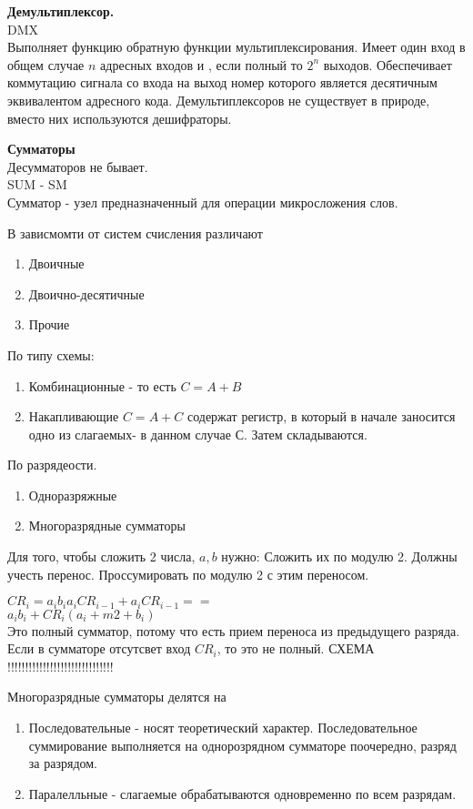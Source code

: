 \Large{ \textbf {Демультиплексор.}}\\
DMX\\
Выполняет функцию обратную функции мультиплексирования.
Имеет один вход в общем случае $n$ адресных входов и , если полный то $2^n$ выходов.
Обеспечивает коммутацию сигнала со входа на выход номер которого является десятичным эквивалентом адресного кода.
Демультиплексоров не существует в природе, вместо них используются дешифраторы.

\Large{ \textbf {Сумматоры}}\\
Десумматоров не бывает.\\
SUM - SM\\
Сумматор - узел предназначенный для операции микросложения слов.

В зависмомти от систем счисления различают
\begin{enumerate}
  \item Двоичные
  \item Двоично-десятичные
  \item Прочие
\end{enumerate}

По типу схемы:

\begin{enumerate}
  \item Комбинационные - то есть $ C = A + B $
  \item Накапливающие $ C = A + C $ содержат регистр, в который в начале заносится одно из слагаемых- в данном случае С. Затем складываются.
\end{enumerate}

По разрядеости.
\begin{enumerate}
  \item Одноразряжные
  \item Многоразрядные сумматоры
\end{enumerate}



Для того, чтобы сложить 2 числа, $a,b$ нужно:
Сложить их по модулю 2. Должны учесть перенос. Проссумировать по модулю 2 с этим переносом.

$CR_i = a_i b_i  a_i CR_{i-1} +a_i CR_{i-1} ==$\\
$a_i b_i + CR_i (a_i +m2+ b_i)$\\
Это полный сумматор, потому что есть прием переноса из предыдущего разряда.\\
Если в сумматоре отсутсвет вход $ CR_i $, то это не полный.
СХЕМА !!!!!!!!!!!!!!!!!!!!!!!!!!!!!!

Многоразрядные сумматоры делятся на
\begin{enumerate}
  \item Последовательные - носят теоретический характер.
  Последовательное суммирование выполняется на однорозрядном сумматоре поочередно, разряд за разрядом.
  \item Паралелльные - слагаемые обрабатываются одновременно по всем разрядам.
\end{enumerate}

